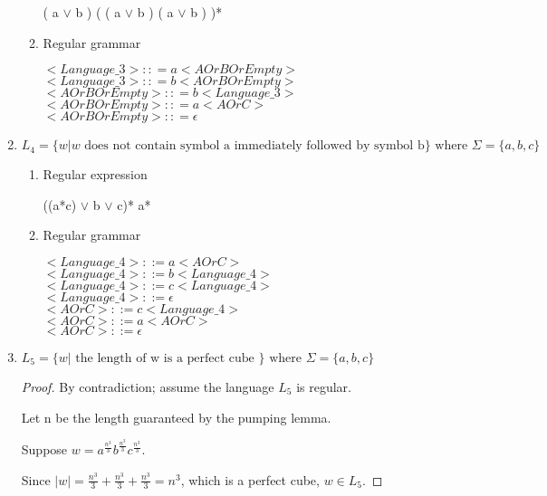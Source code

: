 \begin{enumerate}
\begin{enumerate}
		( a \(\vee\) b ) ( ( a \(\vee\)  b ) ( a \(\vee\) b ) )*
		\item{Regular grammar}
		
		\( <Language\_3> :: = a <AOrBOrEmpty> \)\\
		\( <Language\_3> :: = b <AOrBOrEmpty> \)\\
		\( <AOrBOrEmpty> :: = b <Language\_3> \)\\
		\( <AOrBOrEmpty> :: = a <AOrC> \)\\
		\( <AOrBOrEmpty> :: = \epsilon \)
	\end{enumerate}
	
	\item\(L_4 = \{ w | w \text{ does not contain symbol a immediately followed by symbol b} \} \text{ where } \Sigma = \{ a, b, c \} \)
		
	
	\begin{enumerate}
		\item{Regular expression}
		
		((a*c) \(\vee\) b \(\vee\) c)* a*
		\item{Regular grammar}
		
		\( <Language\_4> ::= a <AOrC> \)\\
		\( <Language\_4> ::= b <Language\_4> \)\\
		\( <Language\_4> ::= c <Language\_4> \)\\
		\( <Language\_4> ::= \epsilon \)\\
		\( <AOrC> ::= c <Language\_4> \)\\
		\( <AOrC> ::= a <AOrC> \)\\
		\( <AOrC> ::= \epsilon \)\\
		
	\end{enumerate}
	
	\item\(L_5 = \{ w | \text{ the length of w is a perfect cube } \} \text{ where } \Sigma = \{ a, b, c \} \)
	
	\begin{proof}
	By contradiction; assume the language \(L_5\) is regular.
	
	Let n be the length guaranteed by the pumping lemma.   
	
	Suppose \( w = a^{\frac{n^3}{3}} b^{\frac{n^3}{3}} c^{\frac{n^3}{3}} \).
	
	Since \( |w| = \frac{n^3}{3} + \frac{n^3}{3} + \frac{n^3}{3} = n^3 \), which is a perfect cube, \( w \in L_5 \).
	

\end{proof}
\end{enumerate}
